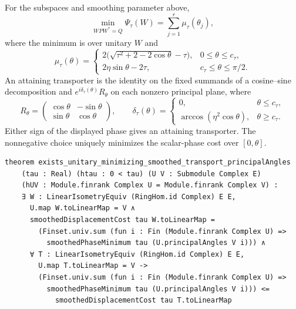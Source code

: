 \begin{theorem}
\label{thm:smoothed-transport}
For the subspaces and smoothing parameter above,
\begin{equation}
 \min_{WPW^*=Q}\Psi_\tau(W)=\sum_{j=1}^r \mu_\tau(\theta_j),
 \label{eq:smoothed-global-minimum}
\end{equation}
where the minimum is over unitary $W$ and
\[
 \mu_\tau(\theta)=
 \begin{cases}
  2\bigl(\sqrt{\tau^2+2-2\cos\theta}-\tau\bigr),
        &0\leq\theta\leq c_\tau,\\
  2\eta\sin\theta-2\tau,
        &c_\tau\leq\theta\leq\pi/2.
 \end{cases}
\]
An attaining transporter is the identity on the fixed summands of a
cosine--sine decomposition and $e^{i\delta_\tau(\theta)}R_\theta$ on
each nonzero principal plane, where
\[
 R_\theta=\begin{pmatrix}\cos\theta&-\sin\theta\\
                              \sin\theta&\cos\theta\end{pmatrix},
 \qquad
 \delta_\tau(\theta)=
 \begin{cases}
   0,&\theta\leq c_\tau,\\
   \arccos(\eta^2\cos\theta),&\theta\geq c_\tau.
 \end{cases}
\]
Either sign of the displayed phase gives an attaining transporter.
The nonnegative choice uniquely minimizes the scalar-phase cost over
$[0,\theta]$.
\end{theorem}

\begin{lstlisting}[style=leanpaper,
 caption={Lean signature for the unrestricted minimum. The surrounding
 finite-dimensional complex Hilbert-space context is omitted.
 \texttt{smoothedDisplacementCost} is $\Psi_\tau$ and
 \texttt{smoothedPhaseMinimum} is $\mu_\tau$.
 The conclusion gives an attaining unitary and the lower bound for
 every admissible competitor.},
 label={lst:smoothed-global}]
theorem exists_unitary_minimizing_smoothed_transport_principalAngles
    (tau : Real) (htau : 0 < tau) (U V : Submodule Complex E)
    (hUV : Module.finrank Complex U = Module.finrank Complex V) :
    ∃ W : LinearIsometryEquiv (RingHom.id Complex) E E,
      U.map W.toLinearMap = V ∧
      smoothedDisplacementCost tau W.toLinearMap =
        (Finset.univ.sum (fun i : Fin (Module.finrank Complex U) =>
          smoothedPhaseMinimum tau (U.principalAngles V i))) ∧
      ∀ T : LinearIsometryEquiv (RingHom.id Complex) E E,
        U.map T.toLinearMap = V ->
        (Finset.univ.sum (fun i : Fin (Module.finrank Complex U) =>
          smoothedPhaseMinimum tau (U.principalAngles V i))) <=
            smoothedDisplacementCost tau T.toLinearMap
\end{lstlisting}

